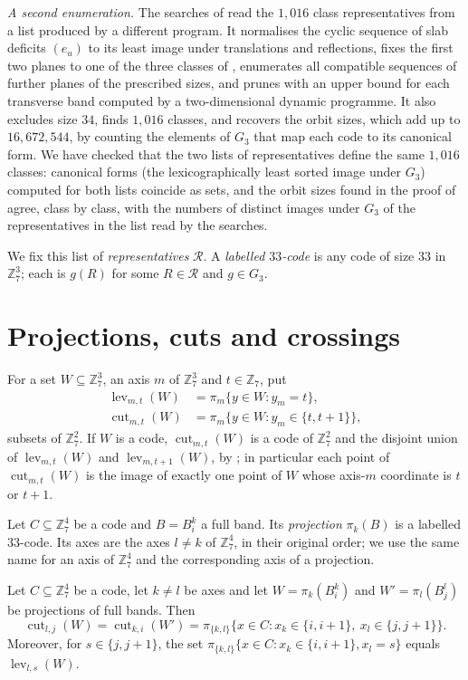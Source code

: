 \documentclass[11pt,colorlinks]{charlie}
\newcommand{\Zs}{\mathbb{Z}_7}
\newcommand{\cut}{\operatorname{cut}}
\newcommand{\lev}{\operatorname{lev}}
\newcommand{\cR}{\mathcal{R}}
\begin{document}
\emph{A second enumeration.} The searches of  read the $1{,}016$ class representatives from a list produced by a different program. It normalises the cyclic sequence of slab deficits $(e_u)$ to its least image under translations and reflections, fixes the first two planes to one of the three classes of , enumerates all compatible sequences of further planes of the prescribed sizes, and prunes with an upper bound for each transverse band computed by a two-dimensional dynamic programme. It also excludes size $34$, finds $1{,}016$ classes, and recovers the orbit sizes, which add up to $16{,}672{,}544$, by counting the elements of $G_3$ that map each code to its canonical form. We have checked that the two lists of representatives define the same $1{,}016$ classes: canonical forms (the lexicographically least sorted image under $G_3$) computed for both lists coincide as sets, and the orbit sizes found in the proof of  agree, class by class, with the numbers of distinct images under $G_3$ of the representatives in the list read by the searches.

We fix this list of \emph{representatives} $\cR$. A \emph{labelled $33$-code} is any code of size $33$ in $\Zs^3$; each is $g(R)$ for some $R\in\cR$ and $g\in G_3$.

\section{Projections, cuts and crossings}\label{sec:crossings}
For a set $W\subseteq\Zs^3$, an axis $m$ of $\Zs^3$ and $t\in\Zs$, put
\begin{align*}
 \lev_{m,t}(W)&=\pi_m\{y\in W:y_m=t\},\\
 \cut_{m,t}(W)&=\pi_m\{y\in W:y_m\in\{t,t+1\}\},
\end{align*}
subsets of $\Zs^2$. If $W$ is a code, $\cut_{m,t}(W)$ is a code of $\Zs^2$ and the disjoint union of $\lev_{m,t}(W)$ and $\lev_{m,t+1}(W)$, by ; in particular each point of $\cut_{m,t}(W)$ is the image of exactly one point of $W$ whose axis-$m$ coordinate is $t$ or $t+1$.

Let $C\subseteq\Zs^4$ be a code and $B=B^k_i$ a full band. Its \emph{projection} $\pi_k(B)$ is a labelled $33$-code. Its axes are the axes $l\ne k$ of $\Zs^4$, in their original order; we use the same name for an axis of $\Zs^4$ and the corresponding axis of a projection.

\begin{lemma}[Crossings]\label{lem:crossing}
Let $C\subseteq\Zs^4$ be a code, let $k\ne l$ be axes and let $W=\pi_k(B^k_i)$ and $W'=\pi_l(B^l_j)$ be projections of full bands. Then
\[
 \cut_{l,j}(W)=\cut_{k,i}(W')=\pi_{\{k,l\}}\{x\in C:x_k\in\{i,i+1\},\ x_l\in\{j,j+1\}\}.
\]
Moreover, for $s\in\{j,j+1\}$, the set $\pi_{\{k,l\}}\{x\in C:x_k\in\{i,i+1\},x_l=s\}$ equals $\lev_{l,s}(W)$.
\end{lemma}
\end{document}
